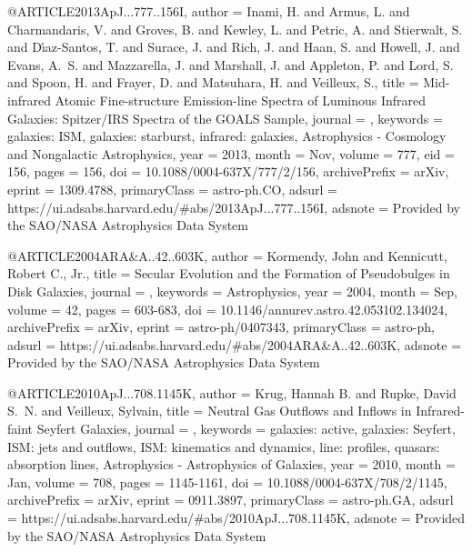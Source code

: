 \documentclass[longauth]{aa}
\begin{document}
{@ARTICLE{2013ApJ...777..156I,
       author = {{Inami}, H. and {Armus}, L. and {Charmandaris}, V. and {Groves}, B. and {Kewley}, L. and {Petric}, A. and {Stierwalt}, S. and {D{\'\i}az-Santos}, T. and {Surace}, J. and {Rich}, J. and {Haan}, S. and {Howell}, J. and {Evans}, A.~S. and {Mazzarella}, J. and {Marshall}, J. and {Appleton}, P. and {Lord}, S. and {Spoon}, H. and {Frayer}, D. and {Matsuhara}, H. and {Veilleux}, S.},
        title = {Mid-infrared Atomic Fine-structure Emission-line Spectra of Luminous Infrared Galaxies: Spitzer/IRS Spectra of the GOALS Sample},
      journal = {\apj},
     keywords = {galaxies: ISM, galaxies: starburst, infrared: galaxies, Astrophysics - Cosmology and Nongalactic Astrophysics},
         year = 2013,
        month = Nov,
       volume = {777},
          eid = {156},
        pages = {156},
          doi = {10.1088/0004-637X/777/2/156},
archivePrefix = {arXiv},
       eprint = {1309.4788},
 primaryClass = {astro-ph.CO},
       adsurl = {https://ui.adsabs.harvard.edu/#abs/2013ApJ...777..156I},
      adsnote = {Provided by the SAO/NASA Astrophysics Data System}
}

@ARTICLE{2004ARA&A..42..603K,
       author = {{Kormendy}, John and {Kennicutt}, Robert C., Jr.},
        title = {Secular Evolution and the Formation of Pseudobulges in Disk Galaxies},
      journal = {\araa},
     keywords = {Astrophysics},
         year = 2004,
        month = Sep,
       volume = {42},
        pages = {603-683},
          doi = {10.1146/annurev.astro.42.053102.134024},
archivePrefix = {arXiv},
       eprint = {astro-ph/0407343},
 primaryClass = {astro-ph},
       adsurl = {https://ui.adsabs.harvard.edu/#abs/2004ARA&A..42..603K},
      adsnote = {Provided by the SAO/NASA Astrophysics Data System}
}

@ARTICLE{2010ApJ...708.1145K,
       author = {{Krug}, Hannah B. and {Rupke}, David S.~N. and {Veilleux}, Sylvain},
        title = {Neutral Gas Outflows and Inflows in Infrared-faint Seyfert Galaxies},
      journal = {\apj},
     keywords = {galaxies: active, galaxies: Seyfert, ISM: jets and outflows, ISM:
        kinematics and dynamics, line: profiles, quasars: absorption
        lines, Astrophysics - Astrophysics of Galaxies},
         year = 2010,
        month = Jan,
       volume = {708},
        pages = {1145-1161},
          doi = {10.1088/0004-637X/708/2/1145},
archivePrefix = {arXiv},
       eprint = {0911.3897},
 primaryClass = {astro-ph.GA},
       adsurl = {https://ui.adsabs.harvard.edu/#abs/2010ApJ...708.1145K},
      adsnote = {Provided by the SAO/NASA Astrophysics Data System}
}

}
\end{document}
